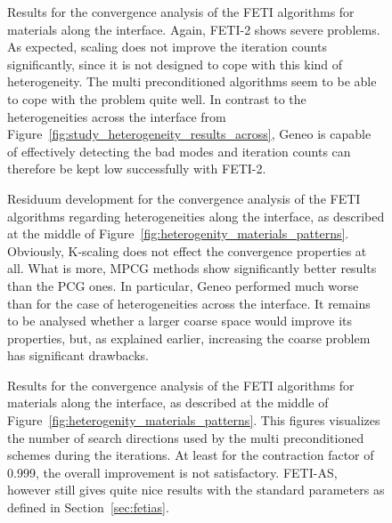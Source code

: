 \begin{figure}[tb]
  \begin{center}
    
    \caption[Study of heterogeneities along the interface: \# iterations]{Results for the convergence analysis of the FETI algorithms for materials along the interface. Again, FETI-2 shows severe problems. As expected, scaling does not improve the iteration counts significantly, since it is not designed to cope with this kind of heterogeneity. The multi preconditioned algorithms seem to be able to cope with the problem quite well. In contrast to the heterogeneities across the interface from Figure~\ref{fig:study_heterogeneity_results_across}, Geneo is capable of effectively detecting the bad modes and iteration counts can therefore be kept low successfully with FETI-2.}
    \label{fig:study_heterogeneity_results_along}
  \end{center}
\end{figure}

\begin{figure}
  \begin{center}
    
    \caption[Study of heterogeneities along the interface: residua]{Residuum development for the convergence analysis of the FETI algorithms regarding heterogeneities along the interface, as described at the middle of Figure~\ref{fig:heterogenity_materials_patterns}. Obviously, K-scaling does not effect the convergence properties at all. What is more, MPCG methods show significantly better results than the PCG ones. In particular, Geneo performed much worse than for the case of heterogeneities across the interface. It remains to be analysed whether a larger coarse space would improve its properties, but, as explained earlier, increasing the coarse problem has significant drawbacks. }
    \label{fig:heterogeneity_along_residuum}
  \end{center}
\end{figure}

\begin{figure}
  \begin{center}
    
    \caption[Study of heterogeneities across the interface: \# search directions]{Results for the convergence analysis of the FETI algorithms for materials along the interface, as described at the middle of Figure~\ref{fig:heterogenity_materials_patterns}. This figures visualizes the number of search directions used by the multi preconditioned schemes during the iterations. At least for the contraction factor of 0.999, the overall improvement is not satisfactory. FETI-AS, however still gives quite nice results with the standard parameters as defined in Section~\ref{sec:fetias}. }
    \label{fig:heterogeneity_along_numsdir}
  \end{center}
\end{figure}






